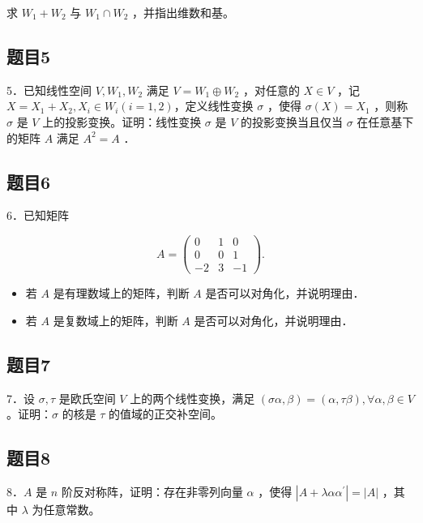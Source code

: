 \documentclass{article}
\begin{document}
求 \(W_{1}+W_{2}\) 与 \(W_{1} \cap W_{2}\) ，并指出维数和基。

\subsection{题目5}
5．已知线性空间 \(V, W_{1}, W_{2}\) 满足 \(V=W_{1} \oplus W_{2}\) ，对任意的 \(X \in V\) ，记 \(X=X_{1}+X_{2}, X_{i} \in W_{i}(i=1,2)\)，定义线性变换 \(\sigma\) ，使得 \(\sigma(X)=X_{1}\) ，则称 \(\sigma\) 是 \(V\) 上的投影变换。证明：线性变换 \(\sigma\) 是 \(V\) 的投影变换当且仅当 \(\sigma\) 在任意基下的矩阵 \(A\) 满足 \(A^{2}=A\) ．

\subsection{题目6}
6．已知矩阵

\[
A=\left(\begin{array}{ccc}
0 & 1 & 0 \\
0 & 0 & 1 \\
-2 & 3 & -1
\end{array}\right) .
\]

\begin{itemize}
  \item[（1）] 若 \(A\) 是有理数域上的矩阵，判断 \(A\) 是否可以对角化，并说明理由．
  \item[（2）] 若 \(A\) 是复数域上的矩阵，判断 \(A\) 是否可以对角化，并说明理由．
\end{itemize}

\subsection{题目7}
7．设 \(\sigma, \tau\) 是欧氏空间 \(V\) 上的两个线性变换，满足 \((\sigma \alpha, \beta)=(\alpha, \tau \beta), \forall \alpha, \beta \in V\) 。证明：\(\sigma\) 的核是 \(\tau\) 的值域的正交补空间。

\subsection{题目8}
8．\(A\) 是 \(n\) 阶反对称阵，证明：存在非零列向量 \(\alpha\) ，使得 \(\left|A+\lambda \alpha \alpha^{\prime}\right|=|A|\) ，其中 \(\lambda\) 为任意常数。
\end{document}

